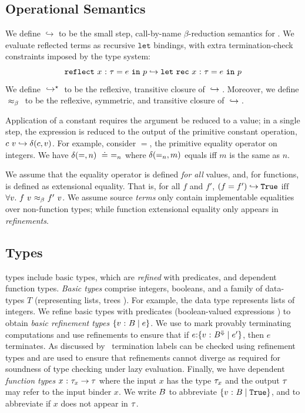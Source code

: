\subsection{Operational Semantics}
We define $\hookrightarrow$ to be the small step, call-by-name
$\beta$-reduction semantics for \corelan.
%
We evaluate reflected terms %
as recursive $\mathtt{let}$ bindings, with extra termination-check
constraints imposed by the type system:
%
$$
{\mathtt{reflect}}\ {x} \ \text{:}\ {\tau} = e\ \mathtt{in}\ {p}
\hookrightarrow
{\ensuremath{\mathtt{let\ rec}}}\ {x} \ \text{:}\ {\tau} = e\ \mathtt{in}\ {p}
$$
%
We define ${}\hookrightarrow^{\star}{}$ to be the reflexive,
transitive closure of ${}\hookrightarrow{}$.
%
Moreover, we define ${}{\ \approx_{\beta}\ }{}$ to be the reflexive,
symmetric, and transitive closure of ${}\hookrightarrow{}$.

 Application of a constant requires the
argument be reduced to a value; in a single step, the
expression is reduced to the output of the primitive
constant operation, \ie ${c\ v} \hookrightarrow \delta(c, v)$.
%
For example, consider $=$, the primitive equality
operator on integers.
%
We have $\delta(=, n) \ \doteq\  =_n$
where $\delta(=_n, m)$ equals \etrue
iff $m$ is the same as $n$.
%

We assume that the equality operator
is defined \emph{for all} values,
and, for functions, is defined as
extensional equality.
%
That is, for all
$f$ and $f'$,
${(f = f')}\hookrightarrow{\ensuremath{\mathtt{True}}}$
   $\mbox{iff}$
  $\forall v.\ {f\ v}{\ \approx_{\beta}\ }{f'\ v}$.
%
We assume source \emph{terms} only contain implementable equalities
over non-function types; while function extensional equality only
appears in \emph{refinements}. %

\subsection{Types}

\corelan types include basic types, which are \emph{refined} with predicates,
and dependent function types.
%
\emph{Basic types} \btyp comprise integers, booleans, and a family of data-types
$T$ (representing lists, trees \etc).
%
For example, the data type \tintlist represents lists of integers.
%
We refine basic types with predicates (boolean-valued expressions ) to obtain
\emph{basic refinement types} $\{ {v} \ \text{:}\ {B} \mid e \}$.
%
%
We use \tlabel to mark provably terminating
computations and use
refinements to ensure that if
${{e}\text{:}{\ensuremath{\{ {v} \ \text{:}\ {B^\Downarrow} \mid e' \}}}}$,
then $e$ terminates.
%
As discussed by~\citet{Vazou14} termination labels
can be checked using refinement types and are used
to ensure that refinements cannot diverge as required
for soundness of type checking under lazy evaluation.
%
Finally, we have dependent \emph{function types} ${x} \ \text{:}\ {\tau_x} \rightarrow \tau$
where the input $x$ has the type $\tau_x$ and the output $\tau$ may
refer to the input binder $x$.
%
We write $B$ to abbreviate $\{ {v} \ \text{:}\ {B} \mid \mathtt{True} \}$,
and  to abbreviate  if
$x$ does not appear in $\tau$.



